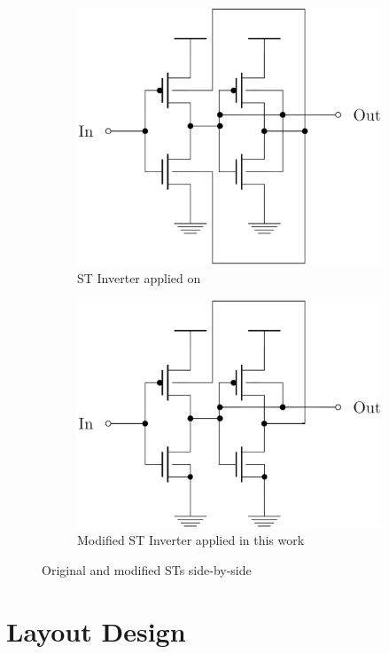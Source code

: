 \documentclass[ecp,tc, english]{iiufrgs}
\begin{document}
\begin{figure}[H]
\centering
\begin{subfigure}{.5\textwidth}
  \centering
  \includegraphics[width=.8\linewidth]{STOriginal.eps}
  \caption{ST Inverter applied on \citet{dokania2015circuit}}
  \label{fig:sub1}
\end{subfigure}%
\begin{subfigure}{.5\textwidth}
  \centering
  \includegraphics[width=.8\linewidth]{STcorrigido.eps}
  \caption{Modified ST Inverter applied in this work}
  \label{fig:sub2}
\end{subfigure}
\caption{Original and modified STs side-by-side}
\label{fig:test}
\end{figure}

\section{Layout Design}
\end{document}
